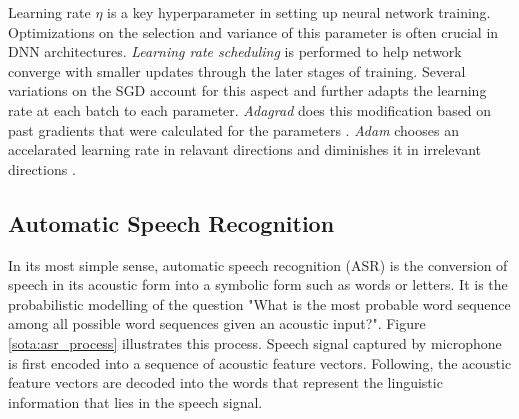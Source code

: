 Learning rate $\eta$ is a key hyperparameter in setting up neural network training. Optimizations on the selection and variance of this parameter is often crucial in DNN architectures. \textit{Learning rate scheduling} is performed to help network converge with smaller updates through the later stages of training. Several variations on the SGD account for this aspect and further adapts the learning rate at each batch to each parameter. \textit{Adagrad} does this modification based on past gradients that were calculated for the parameters \citep{adagrad}. \textit{Adam} chooses an accelarated learning rate in relavant directions and diminishes it in irrelevant directions \citep{DBLP:journals/corr/KingmaB14}. 











\subsection{Automatic Speech Recognition}
\label{sota:asr}

In its most simple sense, automatic speech recognition (ASR) is the conversion of speech in its acoustic form into a symbolic form such as words or letters. It is the probabilistic modelling of the question "What is the most probable word sequence among all possible word sequences given an acoustic input?". Figure \ref{sota:asr_process} illustrates this process. Speech signal captured by microphone is first encoded into a sequence of acoustic feature vectors. Following, the acoustic feature vectors are decoded into the words that represent the linguistic information that lies in the speech signal. 

